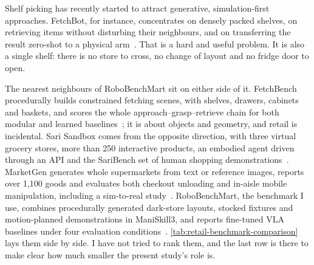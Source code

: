 Shelf picking has recently started to attract generative, simulation-first approaches. FetchBot, for instance, concentrates on densely packed shelves, on retrieving items without disturbing their neighbours, and on transferring the result zero-shot to a physical arm~\cite{liu2025fetchbot}. That is a hard and useful problem. It is also a single shelf: there is no store to cross, no change of layout and no fridge door to open.

The nearest neighbours of RoboBenchMart sit on either side of it. FetchBench procedurally builds constrained fetching scenes, with shelves, drawers, cabinets and baskets, and scores the whole approach--grasp--retrieve chain for both modular and learned baselines~\cite{pmlr-v270-han25a}; it is about objects and geometry, and retail is incidental. Sari Sandbox comes from the opposite direction, with three virtual grocery stores, more than 250 interactive products, an embodied agent driven through an API and the SariBench set of human shopping demonstrations~\cite{gajo2025sari}. MarketGen generates whole supermarkets from text or reference images, reports over 1,100 goods and evaluates both checkout unloading and in-aisle mobile manipulation, including a sim-to-real study~\cite{hu2025marketgen}. RoboBenchMart, the benchmark I use, combines procedurally generated dark-store layouts, stocked fixtures and motion-planned demonstrations in ManiSkill3, and reports fine-tuned VLA baselines under four evaluation conditions~\cite{soshin2025robobenchmart}. \ref{tab:retail-benchmark-comparison} lays them side by side. I have not tried to rank them, and the last row is there to make clear how much smaller the present study's role is.

